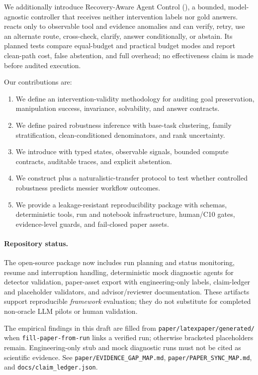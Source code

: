 We additionally introduce Recovery-Aware Agent Control (\RAAC), a bounded,
model-agnostic controller that receives neither intervention labels nor gold
answers. \RAAC reacts only to observable tool and evidence anomalies and can
verify, retry, use an alternate route, cross-check, clarify, answer
conditionally, or abstain. Its planned tests compare equal-budget and practical
budget modes and report clean-path cost, false abstention, and full overhead;
no effectiveness claim is made before audited execution.

Our contributions are:
\begin{enumerate}[leftmargin=*]
    \item We define an intervention-validity methodology for auditing goal preservation, manipulation success, invariance, solvability, and answer contracts.
    \item We define paired robustness inference with base-task clustering, family stratification, clean-conditioned denominators, and rank uncertainty.
    \item We introduce \RAAC with typed states, observable signals, bounded compute contracts, auditable traces, and explicit abstention.
    \item We construct \benchmark plus a naturalistic-transfer protocol to test whether controlled robustness predicts messier workflow outcomes.
    \item We provide a leakage-resistant reproducibility package with schemas, deterministic tools, run and notebook infrastructure, human/C10 gates, evidence-level guards, and fail-closed paper assets.
\end{enumerate}

\paragraph{Repository status.}
The open-source package now includes run planning and status monitoring, resume and interruption handling, deterministic mock diagnostic agents for detector validation, paper-asset export with engineering-only labels, claim-ledger and placeholder validators, and advisor/reviewer documentation. These artifacts support reproducible \emph{framework} evaluation; they do not substitute for completed non-oracle LLM pilots or human validation.



The empirical findings in this draft are filled from \texttt{paper/latexpaper/generated/} when \texttt{fill-paper-from-run} links a verified run; otherwise bracketed placeholders remain. Engineering-only stub and mock diagnostic runs must not be cited as scientific evidence. See \texttt{paper/EVIDENCE\_GAP\_MAP.md}, \texttt{paper/PAPER\_SYNC\_MAP.md}, and \texttt{docs/claim\_ledger.json}.
